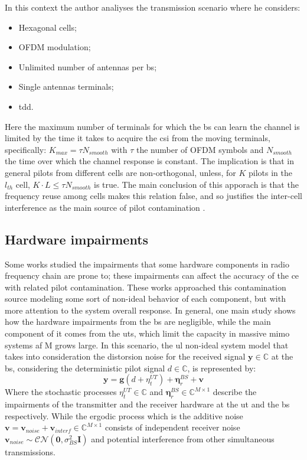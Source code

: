 \documentclass[11pt]{book}
\begin{document}
In this context the author analiyses the transmission scenario where he considers:
\begin{itemize}
  \item Hexagonal cells;
  \item OFDM modulation;
  \item Unlimited number of antennas per \gls{bs};
  \item Single antennas terminals;
  \item \gls{tdd}.
\end{itemize}
Here the maximum number of terminals for which the \gls{bs} can learn the channel is limited by the time it takes to acquire the \gls{csi} from the moving terminals, specifically: $K_{max} = \tau N_{smooth}$ with $\tau$ the number of OFDM symbols and $N_{smooth}$ the time over which the channel response is constant. The implication is that in general pilots from different cells are non-orthogonal, unless, for $K$ pilots in the $l_{th}$ cell, $K\cdot L \leq \tau N_{smooth}$ is true. The main conclusion of this apporach is that the frequency reuse among cells makes this relation false, and so justifies the inter-cell interference as the main source of pilot contamination \cite{Marzetta2010}.
\subsection{Hardware impairments}
Some works studied the impairments that some hardware components in radio frequency chain are prone to; these impairments can affect the accuracy of the \gls{ce} with related pilot contamination. These works approached this contamination source modeling some sort of non-ideal behavior of each component, but with more attention to the system overall response. In general, one main study \cite{Bjornson2014} shows how the hardware impairments from the \gls{bs} are negligible, while the main component of it comes from the \gls{ut}s, which limit the capacity in massive \gls{mimo} systems af M grows large. In this scenario, the \gls{ul} non-ideal system model that takes into consideration the distorsion noise for the received signal $\textbf{y} \in \mathbb{C}$ at the \gls{bs}, considering the deterministic pilot signal $d \in \mathbb{C}$, is represented by:
\begin{equation}
  \textbf{y} = \textbf{g}(d + {\eta}_t^{UT}) + \mathbf{\eta}_r^{BS} + \textbf{v}
\end{equation}
Where the stochastic processes $\eta_t^{UT} \in \mathbb{C}$ and $\mathbf{\eta}_r^{BS} \in \mathbb{C}^{M\times 1}$ describe the impairments of the transmitter and the receiver hardware at the \gls{ut} and the \gls{bs} respectively. While the ergodic process which is the additive noise $\textbf{v} = \textbf{v}_{noise} + \textbf{v}_{interf} \in \mathbb{C}^{M\times 1}$ consists of independent receiver noise $\textbf{v}_{noise} \sim \mathcal{CN}(\textbf{0},\sigma_{BS}^2\textbf{I})$ and potential interference from other simultaneous transmissions.
\end{document}
